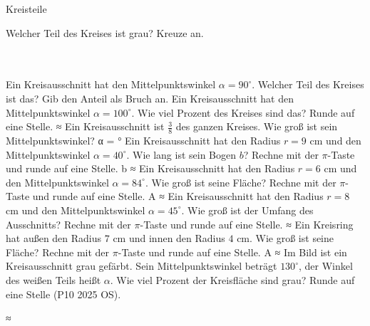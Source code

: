 \setcounter{aufgabe}{19}

\begin{aufgabe}{Kreisteile}
\begin{teile}
\teil Welcher Teil des Kreises ist grau? Kreuze an.\\ \\ \\ 

\teil Ein Kreisausschnitt hat den Mittelpunktswinkel $\alpha = 90^\circ$. Welcher Teil des Kreises ist das? Gib den Anteil als Bruch an. \leerfeld
\teil Ein Kreisausschnitt hat den Mittelpunktswinkel $\alpha = 100^\circ$. Wie viel Prozent des Kreises sind das? Runde auf eine Stelle. ≈ \leerfeld[\%]
\teil Ein Kreisausschnitt ist $\frac{3}{8}$ des ganzen Kreises. Wie groß ist sein Mittelpunktswinkel? α = \leerfeld °
\teil Ein Kreisausschnitt hat den Radius $r = 9$ cm und den Mittelpunktswinkel $\alpha = 40^\circ$. Wie lang ist sein Bogen $b$? Rechne mit der $\pi$-Taste und runde auf eine Stelle. b ≈ \leerfeld[cm]
\teil Ein Kreisausschnitt hat den Radius $r = 6$ cm und den Mittelpunktswinkel $\alpha = 84^\circ$. Wie groß ist seine Fläche? Rechne mit der $\pi$-Taste und runde auf eine Stelle. A ≈ \leerfeld[cm²]
\teil Ein Kreisausschnitt hat den Radius $r = 8$ cm und den Mittelpunktswinkel $\alpha = 45^\circ$. Wie groß ist der Umfang des Ausschnitts? Rechne mit der $\pi$-Taste und runde auf eine Stelle. ≈ \leerfeld[cm]
\teil Ein Kreisring hat außen den Radius $7$ cm und innen den Radius $4$ cm. Wie groß ist seine Fläche? Rechne mit der $\pi$-Taste und runde auf eine Stelle. A ≈ \leerfeld[cm²]
\teil Im Bild ist ein Kreisausschnitt grau gefärbt. Sein Mittelpunktswinkel beträgt $130^\circ$, der Winkel des weißen Teils heißt $\alpha$. Wie viel Prozent der Kreisfläche sind grau? Runde auf eine Stelle \hfill (P10 2025 OS).

≈ \leerfeld[\%]
\end{teile}
\end{aufgabe}

